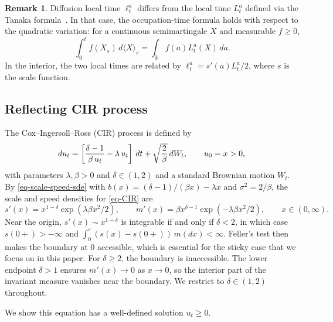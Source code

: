 \documentclass[aap,preprint]{imsart}
\numberwithin{equation}{section}
\theoremstyle{plain}
\theoremstyle{definition}
\newtheorem{remark}[theorem]{Remark}
\begin{document}
\begin{remark}
  Diffusion local time $\ell_t^a$ differs from the  local time $L_t^a$ defined via the Tanaka formula~\cite[Chapter VI, Corollary 1.2]{RevuzYor1999}. In that case, the occupation-time formula \cite[Chapter VI, Corollary 1.6]{RevuzYor1999} holds with respect to the quadratic variation: for a continuous semimartingale $X$ and measurable $f\geq 0$,
$$
\int_0^t f(X_s)\,d\langle X\rangle_s=\int_{\mathbb R} f(a) L_t^a(X)\,da.
$$
In the interior, the two local times are related by $\ell^a_t = s'(a) L^a_t / 2$, where $s$ is the scale function.
\end{remark}



\subsection{Reflecting CIR
process}\label{review-reflecting-cir-process}

The Cox--Ingersoll--Ross (CIR) process  \citep{CoxIngersollRoss1985} is defined by
\begin{equation}\label{eq-CIR}{
      du_t=\left[\frac{\delta-1}{\beta \,u_t} - \lambda\, u_t \right]\,dt + \sqrt{\frac{2}{\beta}}\,dW_t ,\qquad u_0=x>0,\\
}\end{equation} with parameters \(\lambda,\beta>0\) and
\(\delta\in (1,2)\) and a standard  Brownian motion \(W_t \).
By \cref{eq-scale-speed-sde} with $b(x) = (\delta-1)/(\beta x) - \lambda x$ and $\sigma^2 = 2/\beta$, the scale and speed densities for \cref{eq-CIR} are
\begin{equation}\label{eq:scale-speed-cir}
  s'(x) = x^{1-\delta}\exp(\lambda\beta x^2/2), \qquad m'(x) = \beta x^{\delta-1}\exp(-\lambda\beta x^2/2), \qquad x \in (0,\infty).
\end{equation}
Near the origin, $s'(x) \sim x^{1-\delta}$ is integrable if and only if $\delta < 2$, in which case $s(0+) > -\infty$ and $\int_0^\varepsilon (s(x)-s(0+))\,m(dx) < \infty$. Feller's test \citep[Lemma~6.1]{karlintaylor1981} then makes the boundary at $0$ accessible, which is essential for the sticky case that we focus on in this paper.  For $\delta \ge 2$, the boundary is inaccessible.  The lower endpoint $\delta > 1$ ensures $m'(x) \to 0$ as $x \to 0$, so the interior part of the invariant measure vanishes near the boundary.  We restrict to $\delta \in (1,2)$ throughout.

We show this equation has a
well-defined solution \(u_t\ge 0\).
\end{document}
